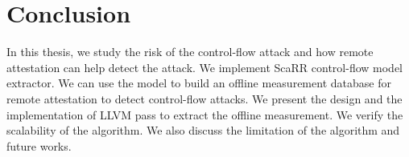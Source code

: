 
\chapter{Conclusion} %

\label{Chapter7} %

In this thesis, we study the risk of the control-flow attack and how remote
attestation can help detect the attack. We implement ScaRR control-flow model
extractor. We can use the model to build an offline measurement database for
remote attestation to detect control-flow attacks. We present the design and the
implementation of LLVM pass to extract the offline measurement. We verify the
scalability of the algorithm. We also discuss the limitation of the algorithm
and future works.
